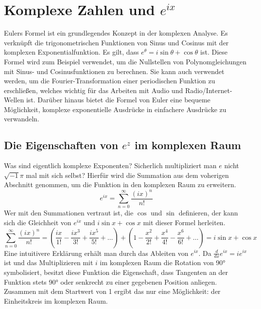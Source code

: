 \section{Komplexe Zahlen und $e^{ix}$}
Eulers Formel ist ein grundlegendes Konzept in der komplexen Analyse. Es verknüpft die trigonometrischen Funktionen von Sinus und Cosinus mit der komplexen Exponentialfunktion. Es gilt, dass $e^\theta = i\sin\theta + \cos\theta$ ist.
Diese Formel wird zum Beispiel verwendet, um die Nullstellen von Polynomgleichungen mit Sinus- und Cosinusfunktionen zu berechnen. Sie kann auch verwendet werden, um die Fourier-Transformation einer periodischen Funktion zu erschließen, welches wichtig für das Arbeiten mit Audio und Radio/Internet-Wellen ist. Darüber hinaus bietet die Formel von Euler eine bequeme Möglichkeit, komplexe exponentielle Ausdrücke in einfachere Ausdrücke zu verwandeln.
\subsection{Die Eigenschaften von $e^z$ im komplexen Raum}
Was sind eigentlich komplexe Exponenten? Sicherlich multipliziert man $e$ nicht $\sqrt{-1}\pi$ mal mit sich selbst? Hierfür wird die Summation aus dem voherigen Abschnitt genommen, um die Funktion in den komplexen Raum zu erweitern. \[
  e^{ix} = \sum_{n=0}^\infty \frac{(ix)^n}{n!}
  \] Wer mit den Summationen vertraut ist, die $\cos$ und  $\sin$ definieren, der kann sich die Gleichheit von $e^{ix}$ und  $i\sin{x}+ \cos{x}$ mit dieser Formel herleiten.  \[
\sum_{n=0}^\infty \frac{(ix)^n}{n!} = (\frac{ix}{1!} - \frac{ix^3}{3!} + \frac{ix^5}{5!} + \dots) + (1 - \frac{x^2}{2!} + \frac{x^4}{4!} - \frac{x^6}{6!} + \dots) = i\sin{x} + \cos{x}
\] Eine intuitivere Erklärung erhält man durch das Ableiten von $e^{ix}$. Da  $\frac{d}{dx}e^{ix} = ie^{ix}$ ist und das Multiplizieren mit $i$ im komplexen Raum die Rotation von 90° symbolisiert, besitzt diese Funktion die Eigenschaft, dass Tangenten an der Funktion stets 90° oder senkrecht 
zu einer gegebenen Position anliegen. Zusammen mit dem Startwert von 1 ergibt das nur eine Möglichkeit: der Einheitskreis im komplexen Raum.
